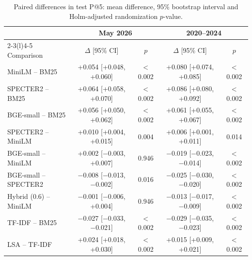 \begin{table}[!t]
\centering
\caption{Paired differences in test P@5: mean difference, 95\% bootstrap interval and Holm-adjusted randomization $p$-value.}
\label{tab:stats}
\footnotesize
\setlength{\tabcolsep}{5pt}
\begin{tabular}{@{}lcccc@{}}
\toprule
 & \multicolumn{2}{c}{May 2026} & \multicolumn{2}{c}{2020--2024} \\
\cmidrule(lr){2-3}\cmidrule(l){4-5}
Comparison & $\Delta$ [95\% CI] & $p$ & $\Delta$ [95\% CI] & $p$ \\
\midrule
MiniLM -- BM25 & +0.054 [+0.048, +0.060] & $<$0.002 & +0.080 [+0.074, +0.085] & $<$0.002 \\
SPECTER2 -- BM25 & +0.064 [+0.058, +0.070] & $<$0.002 & +0.086 [+0.080, +0.092] & $<$0.002 \\
BGE-small -- BM25 & +0.056 [+0.050, +0.062] & $<$0.002 & +0.061 [+0.055, +0.067] & $<$0.002 \\
SPECTER2 -- MiniLM & +0.010 [+0.004, +0.015] & 0.004 & +0.006 [+0.001, +0.011] & 0.014 \\
BGE-small -- MiniLM & +0.002 [$-$0.003, +0.007] & 0.946 & $-$0.019 [$-$0.023, $-$0.014] & $<$0.002 \\
BGE-small -- SPECTER2 & $-$0.008 [$-$0.013, $-$0.002] & 0.016 & $-$0.025 [$-$0.030, $-$0.020] & $<$0.002 \\
Hybrid (0.6) -- MiniLM & $-$0.001 [$-$0.006, +0.004] & 0.946 & $-$0.013 [$-$0.017, $-$0.009] & $<$0.002 \\
TF-IDF -- BM25 & $-$0.027 [$-$0.033, $-$0.021] & $<$0.002 & $-$0.029 [$-$0.035, $-$0.023] & $<$0.002 \\
LSA -- TF-IDF & +0.024 [+0.018, +0.030] & $<$0.002 & +0.015 [+0.009, +0.021] & $<$0.002 \\
\bottomrule
\end{tabular}
\end{table}
